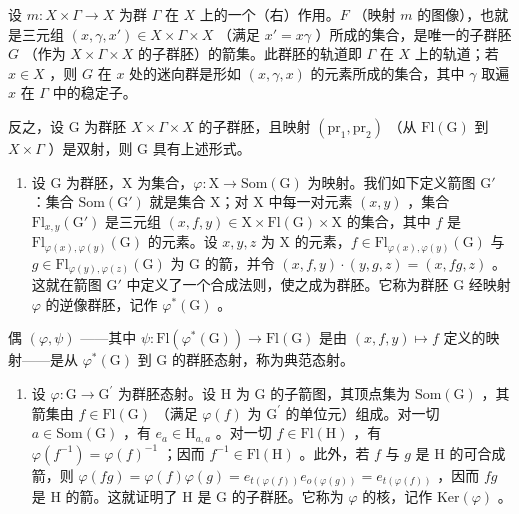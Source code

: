 设 \(m\colon X \times \Gamma \to X\) 为群 \(\Gamma\) 在 \(X\) 上的一个（右）作用。\(F\) （映射 \(m\) 的图像），也就是三元组 \((x, \gamma, x') \in X \times \Gamma \times X\) （满足 \(x' = x\gamma\) ）所成的集合，是唯一的子群胚 \(G\) （作为 \(X \times \Gamma \times X\) 的子群胚）的箭集。此群胚的轨道即 \(\Gamma\) 在 \(X\) 上的轨道；若 \(x \in X\) ，则 \(G\) 在 \(x\) 处的迷向群是形如 \((x, \gamma, x)\) 的元素所成的集合，其中 \(\gamma\) 取遍 \(x\) 在 \(\Gamma\) 中的稳定子。

反之，设 G 为群胚 \(X \times \Gamma \times X\) 的子群胚，且映射 \((\mathrm{pr}_{1}, \mathrm{pr}_{2})\) （从 \(\mathrm{Fl}(\mathrm{G})\) 到 \(X \times \Gamma\) ）是双射，则 G 具有上述形式。

\begin{enumerate}
\def\labelenumi{\arabic{enumi})}
\setcounter{enumi}{3}
\tightlist
\item
  设 G 为群胚，X 为集合，\(\varphi\colon\mathrm{X}\to\mathrm{Som}(\mathrm{G})\) 为映射。我们如下定义箭图 \(\mathrm{G}'\) ：集合 \(\mathrm{Som}(\mathrm{G}')\) 就是集合 X；对 X 中每一对元素 \((x,y)\) ，集合 \(\mathrm{Fl}_{x,y}(\mathrm{G}')\) 是三元组 \((x,f,y)\in\mathrm{X}\times\mathrm{Fl}(\mathrm{G})\times\mathrm{X}\) 的集合，其中 \(f\) 是 \(\mathrm{Fl}_{\varphi(x),\varphi(y)}(\mathrm{G})\) 的元素。设 \(x,y,z\) 为 X 的元素，\(f\in\mathrm{Fl}_{\varphi(x),\varphi(y)}(\mathrm{G})\) 与 \(g\in\mathrm{Fl}_{\varphi(y),\varphi(z)}(\mathrm{G})\) 为 G 的箭，并令 \((x,f,y)\cdot(y,g,z)=(x,fg,z)\) 。这就在箭图 \(\mathrm{G}'\) 中定义了一个合成法则，使之成为群胚。它称为群胚 G 经映射 \(\varphi\) 的逆像群胚，记作 \(\varphi^{*}(\mathrm{G})\) 。
\end{enumerate}

偶 \((\varphi,\psi)\) ——其中 \(\psi\colon\mathrm{Fl}(\varphi^{*}(\mathrm{G}))\to\mathrm{Fl}(\mathrm{G})\) 是由 \((x,f,y)\mapsto f\) 定义的映射——是从 \(\varphi^{*}(\mathrm{G})\) 到 G 的群胚态射，称为典范态射。

\begin{enumerate}
\def\labelenumi{\arabic{enumi})}
\setcounter{enumi}{4}
\tightlist
\item
  设 \(\varphi\colon\mathrm{G}\to\mathrm{G}^{\prime}\) 为群胚态射。设 H 为 G 的子箭图，其顶点集为 \(\mathrm{Som}(\mathrm{G})\) ，其箭集由 \(f\in\mathrm{Fl}(\mathrm{G})\) （满足 \(\varphi(f)\) 为 \(\mathrm{G}^{\prime}\) 的单位元）组成。对一切 \(a\in\mathrm{Som}(\mathrm{G})\) ，有 \(e_{a}\in\mathrm{H}_{a,a}\) 。对一切 \(f\in\mathrm{Fl}(\mathrm{H})\) ，有 \(\varphi(f^{-1})=\varphi(f)^{-1}\) ；因而 \(f^{-1}\in\mathrm{Fl}(\mathrm{H})\) 。此外，若 \(f\) 与 \(g\) 是 H 的可合成箭，则 \(\varphi(fg)=\varphi(f)\varphi(g)=e_{t(\varphi(f))}e_{o(\varphi(g))}=e_{t(\varphi(f))}\) ，因而 \(fg\) 是 H 的箭。这就证明了 H 是 G 的子群胚。它称为 \(\varphi\) 的核，记作 \(\mathrm{Ker}(\varphi)\) 。
\end{enumerate}

